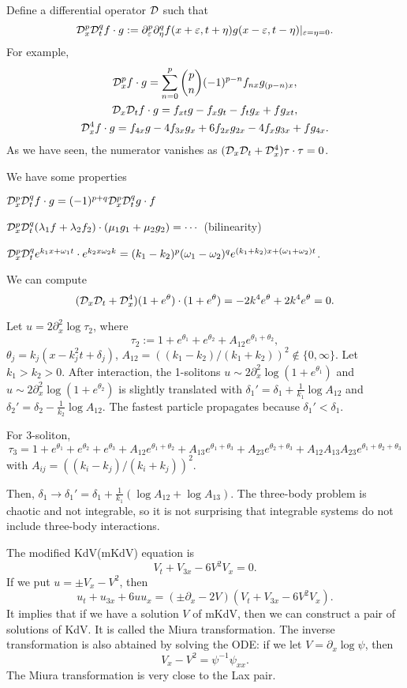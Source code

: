 \documentclass{../../../small}
\begin{document}
Define a differential operator $\mathcal{D}$ such that
\[\mathcal{D}_x^p\mathcal{D}_t^qf\cdot g:=\partial_\varepsilon^p\partial_\eta^qf(x+\varepsilon,t+\eta)g(x-\varepsilon,t-\eta)|_{\varepsilon=\eta=0}.\]
For example,
\begin{gather*}
\mathcal{D}_x^pf\cdot g=\sum_{n=0}^p{p\choose n}(-1)^{p-n}f_{nx}g_{(p-n)x},\\
\mathcal{D}_x\mathcal{D}_tf\cdot g=f_{xt}g-f_xg_t-f_tg_x+fg_{xt},\\
\mathcal{D}_x^4f\cdot g=f_{4x}g-4f_{3x}g_x+6f_{2x}g_{2x}-4f_xg_{3x}+fg_{4x}.
\end{gather*}
As we have seen, the numerator vanishes as $(\mathcal{D}_x\mathcal{D}_t+\mathcal{D}_x^4)\tau\cdot\tau=0$.

We have some properties
\begin{parts}
\item $\mathcal{D}_x^p\mathcal{D}_t^qf\cdot g=(-1)^{p+q}\mathcal{D}_x^p\mathcal{D}_t^qg\cdot f$
\item $\mathcal{D}_x^p\mathcal{D}_t^q(\lambda_1f+\lambda_2f_2)\cdot(\mu_1g_1+\mu_2g_2)=\cdots$ (bilinearity)
\item $\mathcal{D}_x^p\mathcal{D}_t^qe^{k_1x+\omega_1t}\cdot e^{k_2x\omega_2k}=(k_1-k_2)^p(\omega_1-\omega_2)^qe^{(k_1+k_2)x+(\omega_1+\omega_2)t}$.
\end{parts}
We can compute
\[(\mathcal{D}_x\mathcal{D}_t+\mathcal{D}_x^4)(1+e^\theta)\cdot(1+e^\theta)=-2k^4e^\theta+2k^4e^\theta=0.\]

Let $u=2\partial_x^2\log\tau_2$, where
\[\tau_2:=1+e^{\theta_1}+e^{\theta_2}+A_{12}e^{\theta_1+\theta_2},\]
$\theta_j=k_j(x-k_j^2t+\delta_j)$, $A_{12}=((k_1-k_2)/(k_1+k_2))^2\notin\{0,\infty\}$.
Let $k_1>k_2>0$.
After interaction, the 1-solitons $u\sim2\partial_x^2\log(1+e^{\theta_1})$ and $u\sim2\partial_x^2\log(1+e^{\theta_2})$ is slightly translated with $\delta_1'=\delta_1+\frac1{k_1}\log A_{12}$ and $\delta_2'=\delta_2-\frac1{k_2}\log A_{12}$.
The fastest particle propagates because $\delta_1'<\delta_1$.

For 3-soliton,
\[\tau_3=1+e^{\theta_1}+e^{\theta_2}+e^{\theta_3}+A_{12}e^{\theta_1+\theta_2}+A_{13}e^{\theta_1+\theta_3}+A_{23}e^{\theta_2+\theta_3}+A_{12}A_{13}A_{23}e^{\theta_1+\theta_2+\theta_3}\]
with $A_{ij}=((k_i-k_j)/(k_i+k_j))^2$.

Then, $\delta_1\to\delta_1'=\delta_1+\frac1{k_1}(\log A_{12}+\log A_{13})$.
The three-body problem is chaotic and not integrable, so it is not surprising that integrable systems do not include three-body interactions.

The modified KdV(mKdV) equation is
\[V_t+V_{3x}-6V^2V_x=0.\]
If we put $u=\pm V_x-V^2$, then
\[u_t+u_{3x}+6uu_x=(\pm\partial_x-2V)(V_t+V_{3x}-6V^2V_x).\]
It implies that if we have a solution $V$ of mKdV, then we can construct a pair of solutions of KdV.
It is called the Miura transformation.
The inverse transformation is also abtained by solving the ODE: if we let $V=\partial_x\log\psi$, then
\[V_x-V^2=\psi^{-1}\psi_{xx}.\]
The Miura transformation is very close to the Lax pair.
\end{document}
